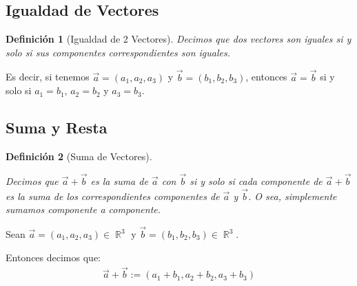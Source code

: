 \documentclass[12pt, fleqn]{report}                             %
\newtheorem{Definition}{Definición}[section]                    %
\DeclareMathOperator \Reals        {\mathbb{R}}                 %
\begin{document}
            \subsection{Igualdad de Vectores}

                \begin{Definition}[Igualdad de 2 Vectores]
                    \label{DefIgualdadVectores}
                    Decimos que dos vectores son iguales si y solo si sus componentes
                    correspondientes son iguales.
                \end{Definition}

                Es decir, si tenemos $\vec{a} = (a_1, a_2, a_3)$ y $\vec{b} = (b_1, b_2, b_3)$,
                entonces $\vec{a} = \vec{b}$ si y solo si $a_1 = b_1$, $a_2 = b_2$ y $a_3 = b_3$.

            
            \subsection{Suma y Resta}
            
                \begin{Definition}[Suma de Vectores]
                    \label{DefSumaVectores}

                    Decimos que $\vec{a}+\vec{b}$ es la suma de $\vec{a}$ con $\vec{b}$ si y solo si 
                    cada componente de $\vec{a}+\vec{b}$ es la suma de los correspondientes componentes
                    de $\vec{a}$ y $\vec{b}$.
                    O sea, simplemente sumamos componente a componente.

                \end{Definition}

                Sean $\vec{a} = (a_1, a_2, a_3) \in \Reals^3$ y $\vec{b}=(b_1, b_2, b_3) \in \Reals^3$.

                Entonces decimos que:
                \begin{align}
                    \vec{a} + \vec{b} := (a_1 + b_1, a_2 + b_2, a_3 + b_3)
                \end{align}
            
\end{document}
